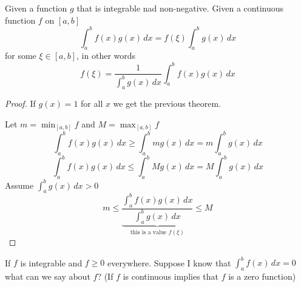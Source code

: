 \begin{theorem*}
  Given a function $g$ that is integrable nad non-negative. 
  Given a continuous function $f$ on $[a, b]$ 
  \[\int_a^b f(x)g(x)\,dx = f(\xi)\int_a^b g(x)\,dx\]
  for some $\xi \in [a, b]$, in other words
  \[ f(\xi) = \frac{1}{\int_a^b g(x)\,dx} \displaystyle\int_a^b f(x)g(x)\,dx\]
\end{theorem*}

\begin{proof}
  If $g(x) = 1$ for all $x$ we get the previous theorem.

  Let $m = \min_{[a, b]} f$ and $M = \max_{[a, b]} f$
  \[ \int_a^b f(x)g(x)\,dx \ge \int_a^b mg(x)\,dx = m\int_a^bg(x)\,dx\]
  \[ \int_a^b f(x)g(x)\,dx \le \int_a^b Mg(x)\,dx = M\int_a^bg(x)\,dx\]
  Assume $\displaystyle \int_a^b g(x)\, dx > 0$
  \[m \le \underbrace{\frac{\displaystyle\int_a^b f(x)g(x)\,dx}{\displaystyle\int_a^b g(x) \,dx}}_{\text{this is a value } f(\xi)} \le M\]
\end{proof}

If $f$ is integrable and $f \ge 0$ everywhere.
Suppose I know that $\int_a^b f(x)\,dx = 0$
what can we say about $f$?
(If $f$ is continuous implies that $f$ is a zero function)